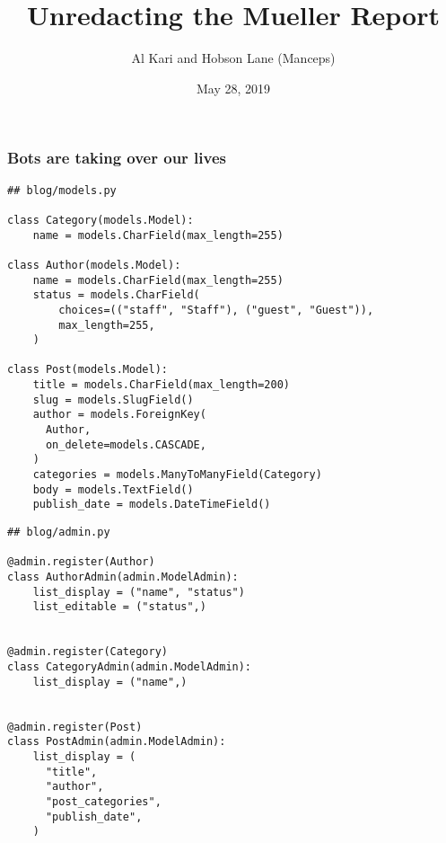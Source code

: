 \documentclass[aspectratio=169]{beamer}
\title{Unredacting the Mueller Report}
\author{Al Kari and Hobson Lane (Manceps)}
\date{May 28, 2019}
\begin{document}
\maketitle

\begin{frame}[fragile]
\frametitle{Bots are taking over our lives}

\begin{multicols}{2}

{\tiny
\begin{verbatim}
## blog/models.py

class Category(models.Model):
    name = models.CharField(max_length=255)

class Author(models.Model):
    name = models.CharField(max_length=255)
    status = models.CharField(
        choices=(("staff", "Staff"), ("guest", "Guest")),
        max_length=255,
    )

class Post(models.Model):
    title = models.CharField(max_length=200)
    slug = models.SlugField()
    author = models.ForeignKey(
      Author,
      on_delete=models.CASCADE,
    )
    categories = models.ManyToManyField(Category)
    body = models.TextField()
    publish_date = models.DateTimeField()
\end{verbatim}
}

\columnbreak

{\tiny
\begin{verbatim}
## blog/admin.py

@admin.register(Author)
class AuthorAdmin(admin.ModelAdmin):
    list_display = ("name", "status")
    list_editable = ("status",)


@admin.register(Category)
class CategoryAdmin(admin.ModelAdmin):
    list_display = ("name",)


@admin.register(Post)
class PostAdmin(admin.ModelAdmin):
    list_display = (
      "title",
      "author",
      "post_categories",
      "publish_date",
    )
\end{verbatim}
}

\end{multicols}

\end{frame}


\begin{frame}
  \begin{figure}[p]
    \centering
  \end{figure}
\end{frame}
\end{document}
